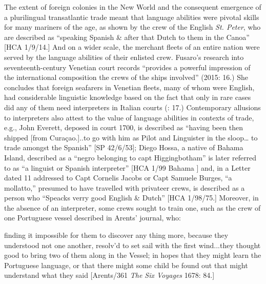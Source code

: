 The extent of foreign colonies in the New World and the consequent emergence of a plurilingual transatlantic trade meant that language abilities were pivotal skills for many mariners of the age, as shown by the crew of the English \textit{St. Peter}, who are described as “speaking Spanish \& after that Dutch to them in the Canoa” [HCA 1/9/14.] And on a wider scale, the merchant fleets of an entire nation were served by the language abilities of their enlisted crew. Fusaro’s research into seventeenth-century Venetian court records “provides a powerful impression of the international composition the crews of the ships involved” (2015: 16.) She concludes that foreign seafarers in Venetian fleets, many of whom were English, had considerable linguistic knowledge based on the fact that only in rare cases did any of them need interpreters in Italian courts (\citealt{Fusaro2015}: 17.) Contemporary allusions to interpreters also attest to the value of language abilities in contexts of trade, e.g., John Everett, deposed in court 1700, is described as “having been then shipped [from Curaçao.]..to go with him as Pilot and Linguister in the sloop… to trade amongst the Spanish” [SP 42/6/53]; Diego Hossa, a native of Bahama Island, described as a “negro belonging to capt Higgingbotham” is later referred to as “a linguist or Spanish interpreter” [HCA 1/99 Bahama \citealt{Islands1722}] and, in a Letter dated 11 \citealt{January1697} addressed to Capt Cornelis Jacobs or Capt Samuele Burges, “a mollatto,” presumed to have travelled with privateer crews, is described as a person who “Speacks verry good English \& Dutch” [HCA 1/98/75.] Moreover, in the absence of an interpreter, some crews sought to train one, such as the crew of one Portuguese vessel described in Arents’ journal, who:

finding it impossible for them to discover any thing more, because they understood not one another, resolv’d to set sail with the first wind...they thought good to bring two of them along in the Vessel; in hopes that they might learn the Portuguese language, or that there might some child be found out that might understand what they said [Arents/361 \textit{The Six Voyages} 1678: 84.] 

